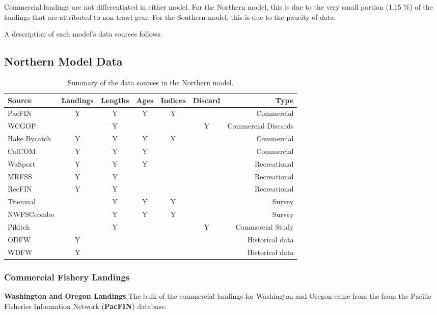 \documentclass[12pt,]{article}
\begin{document}
Commercial landings are not differentiated in either model. For the
Northern model, this is due to the very small portion (1.15 \%) of the
landings that are attributed to non-trawl gear. For the Southern model,
this is due to the paucity of data.

A description of each model's data sources follows.

\subsection{Northern Model Data}\label{northern-model-data}

\vspace{.5cm}

\begin{table}[ht]
\centering
\caption{Summary of the data sources in the Northern model.} 
\label{tab:Data_sources}
\begin{tabular}{lcccccr}
  \hline
Source & Landings & Lengths & Ages & Indices & Discard & Type \\ 
  \hline
PacFIN & Y & Y & Y & Y &  & Commercial \\ 
  WCGOP &  & Y &  &  & Y & Commercial Discards \\ 
  Hake Bycatch & Y & Y & Y & Y &  & Commercial \\ 
  CalCOM & Y & Y & Y &  &  & Commercial \\ 
  WaSport & Y & Y & Y &  &  & Recreational \\ 
  MRFSS & Y & Y &  &  &  & Recreational \\ 
  RecFIN & Y & Y &  &  &  & Recreational \\ 
  Triennial &  & Y & Y & Y &  & Survey \\ 
  NWFSCcombo &  & Y & Y & Y &  & Survey \\ 
  Pikitch &  & Y &  &  & Y & Commercial Study \\ 
  ODFW & Y &  &  &  &  & Historical data \\ 
  WDFW & Y &  &  &  &  & Historical data \\ 
   \hline
\end{tabular}
\end{table}

\subsubsection{Commercial Fishery
Landings}\label{commercial-fishery-landings}

\textbf{Washington and Oregon Landings} The bulk of the commercial
landings for Washington and Oregon came from the from the Pacific
Fisheries Information Network (\textbf{PacFIN}) database.
\end{document}
